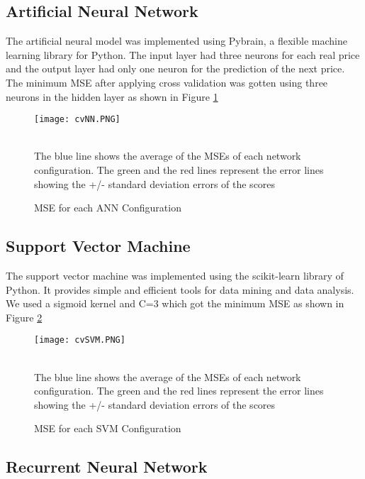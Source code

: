 \subsection{Artificial Neural Network}

The artificial neural model was implemented using Pybrain, a flexible machine learning library for Python. The input layer had three neurons for each real price and the output layer had only one neuron for the prediction of the next price. The minimum MSE after applying cross validation was gotten using three neurons in the hidden layer as shown in  Figure \ref{fig:cvNN}

\begin{figure}[h]
\centering
\texttt{[image: cvNN.PNG]}
\caption{MSE for each ANN Configuration}
\begin{minipage}{12cm}
    \footnotesize
    \emph \\ The blue line shows the average of the MSEs of each network configuration. The green and the red lines represent the error lines showing the +/- standard deviation errors of the scores
    \end{minipage}
\label{fig:cvNN}
\end{figure}

\subsection{Support Vector Machine}
The support vector machine was implemented using the scikit-learn library of Python. It provides simple and efficient tools for data mining and data analysis. We used a sigmoid kernel and C=3 which got the minimum MSE as shown in Figure \ref{fig:cvSVM}

\begin{figure}[h]
\centering
\texttt{[image: cvSVM.PNG]}
\caption{MSE for each SVM Configuration}
\begin{minipage}{12cm}
    \footnotesize
    \emph \\ The blue line shows the average of the MSEs of each network configuration. The green and the red lines represent the error lines showing the +/- standard deviation errors of the scores
    \end{minipage}

\label{fig:cvSVM}
\end{figure}

\subsection{Recurrent Neural Network}

